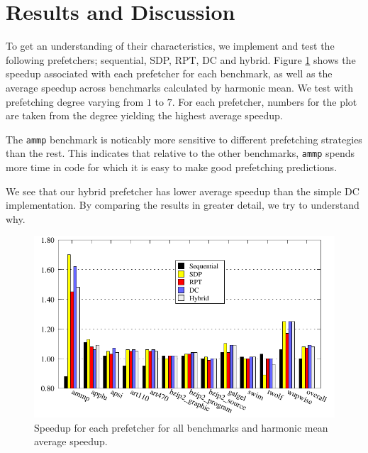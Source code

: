 \section{Results and Discussion}
\label{sec:results-and-discussion}

To get an understanding of their characteristics, we implement and
test the following prefetchers; sequential, SDP, RPT, DC and hybrid.
Figure \ref{fig:comparison} shows the speedup associated with each
prefetcher for each benchmark, as well as the average speedup across
benchmarks calculated by harmonic mean. We test with prefetching
degree varying from $1$ to $7$. For each prefetcher, numbers for the
plot are taken from the degree yielding the highest average speedup.

The \texttt{ammp} benchmark is noticably more sensitive to different
prefetching strategies than the rest. This indicates that relative to
the other benchmarks, \texttt{ammp} spends more time in code for which
it is easy to make good prefetching predictions.

We see that our hybrid prefetcher has lower average speedup than the
simple DC implementation.  By comparing the results in greater detail,
we try to understand why.

\begin{figure}
  \centering
  \includegraphics{plots/overview_speedup.pdf}
  \caption{Speedup for each prefetcher for all benchmarks and harmonic mean average speedup.}
  \label{fig:comparison}
\end{figure}

